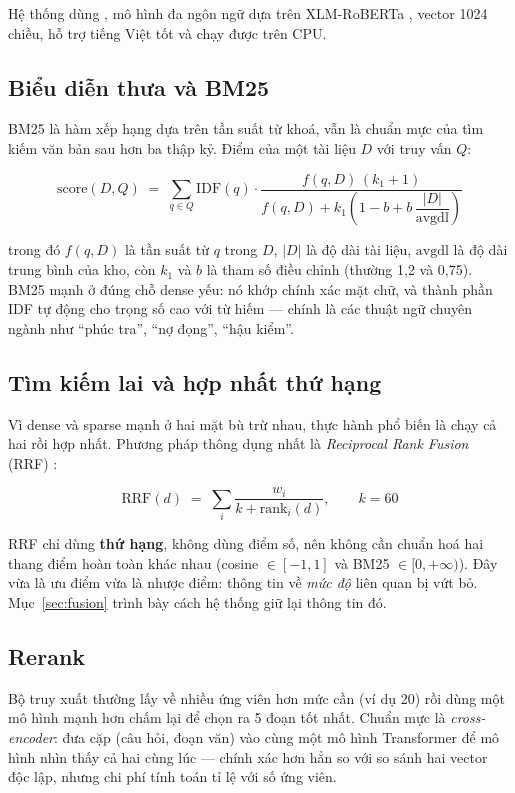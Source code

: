 Hệ thống dùng  \cite{bgem3}, mô hình đa ngôn ngữ dựa trên XLM-RoBERTa
\cite{xlmr}, vector 1024 chiều, hỗ trợ tiếng Việt tốt và chạy được trên CPU.

\subsection{Biểu diễn thưa và BM25}

BM25 \cite{bm25} là hàm xếp hạng dựa trên tần suất từ khoá, vẫn là chuẩn mực của tìm kiếm văn
bản sau hơn ba thập kỷ. Điểm của một tài liệu $D$ với truy vấn $Q$:

\[
\mathrm{score}(D,Q) \;=\; \sum_{q \in Q} \mathrm{IDF}(q)\cdot
\frac{f(q,D)\,(k_1+1)}{f(q,D) + k_1\left(1-b+b\,\dfrac{|D|}{\mathrm{avgdl}}\right)}
\]

trong đó $f(q,D)$ là tần suất từ $q$ trong $D$, $|D|$ là độ dài tài liệu, $\mathrm{avgdl}$ là
độ dài trung bình của kho, còn $k_1$ và $b$ là tham số điều chỉnh (thường 1,2 và 0,75). BM25
mạnh ở đúng chỗ dense yếu: nó khớp chính xác mặt chữ, và thành phần IDF tự động cho trọng số
cao với từ hiếm — chính là các thuật ngữ chuyên ngành như “phúc tra”, “nợ đọng”, “hậu kiểm”.

\subsection{Tìm kiếm lai và hợp nhất thứ hạng}

Vì dense và sparse mạnh ở hai mặt bù trừ nhau, thực hành phổ biến là chạy cả hai rồi hợp nhất.
Phương pháp thông dụng nhất là \emph{Reciprocal Rank Fusion} (RRF) \cite{rrf}:

\[
\mathrm{RRF}(d) \;=\; \sum_{i} \frac{w_i}{k + \mathrm{rank}_i(d)}, \qquad k = 60
\]

RRF chỉ dùng \textbf{thứ hạng}, không dùng điểm số, nên không cần chuẩn hoá hai thang điểm hoàn
toàn khác nhau (cosine $\in [-1,1]$ và BM25 $\in [0,+\infty)$). Đây vừa là ưu điểm vừa là nhược
điểm: thông tin về \emph{mức độ} liên quan bị vứt bỏ. Mục~\ref{sec:fusion} trình bày cách hệ
thống giữ lại thông tin đó.

\subsection{Rerank}

Bộ truy xuất thường lấy về nhiều ứng viên hơn mức cần (ví dụ 20) rồi dùng một mô hình mạnh hơn
chấm lại để chọn ra 5 đoạn tốt nhất. Chuẩn mực là \emph{cross-encoder}: đưa cặp (câu hỏi, đoạn
văn) vào cùng một mô hình Transformer để mô hình nhìn thấy cả hai cùng lúc — chính xác hơn hẳn
so với so sánh hai vector độc lập, nhưng chi phí tính toán tỉ lệ với số ứng viên.

